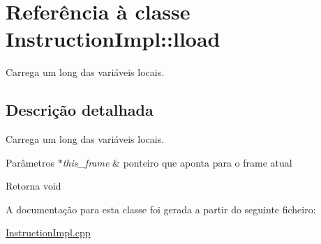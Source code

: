 \hypertarget{class_instruction_impl_1_1lload}{}\section{Referência à classe Instruction\+Impl\+:\+:lload}
\label{class_instruction_impl_1_1lload}


Carrega um long das variáveis locais.  




\subsection{Descrição detalhada}
Carrega um long das variáveis locais. 


\begin{DoxyParams}{Parâmetros}
{\em $\ast$this\+\_\+frame} & ponteiro que aponta para o frame atual \\
\hline
\end{DoxyParams}
\begin{DoxyReturn}{Retorna}
void 
\end{DoxyReturn}


A documentação para esta classe foi gerada a partir do seguinte ficheiro\+:\begin{DoxyCompactItemize}
\item 
\hyperlink{_instruction_impl_8cpp}{Instruction\+Impl.\+cpp}\end{DoxyCompactItemize}
